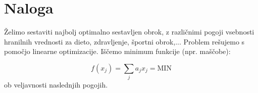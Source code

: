 \documentclass[slovene,11pt,a4paper]{article}
\numberwithin{equation}{section} %
\numberwithin{figure}{section} %
\numberwithin{table}{section} %
\begin{document}
%
%
%
%
%
%
%
%
%




\tableofcontents


\section{Naloga}

Želimo sestaviti najbolj optimalno sestavljen obrok, z različnimi pogoji vsebnosti hranilnih vrednosti za dieto, zdravljenje, športni obrok,... Problem rešujemo s pomočjo linearne optimizacije. Iščemo minimum funkcije (npr. maščobe):

\begin{equation}
\label{eq-mimimum-fukcija}
f(x_j)=\sum_j a_{j} x_j = \text{MIN}
\end{equation}
ob veljavnosti naslednjih pogojih.
\end{document}
